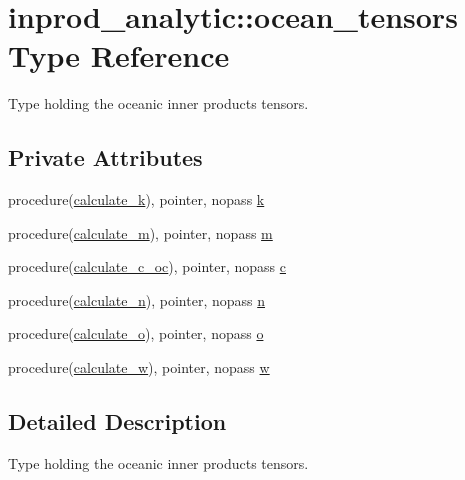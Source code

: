 \hypertarget{structinprod__analytic_1_1ocean__tensors}{}\section{inprod\+\_\+analytic\+:\+:ocean\+\_\+tensors Type Reference}
\label{structinprod__analytic_1_1ocean__tensors}


Type holding the oceanic inner products tensors.  


\subsection*{Private Attributes}
\begin{DoxyCompactItemize}
\item 
procedure(\hyperlink{namespaceinprod__analytic_a084d554f278704061269b6bdf0b85053}{calculate\+\_\+k}), pointer, nopass \hyperlink{structinprod__analytic_1_1ocean__tensors_a9715c83158697198ef484b0bc549bcc3}{k}
\item 
procedure(\hyperlink{namespaceinprod__analytic_a745462230d6120d9486aa7cb724322f5}{calculate\+\_\+m}), pointer, nopass \hyperlink{structinprod__analytic_1_1ocean__tensors_a9f72e3b14a98a50209f86b01626f6c53}{m}
\item 
procedure(\hyperlink{namespaceinprod__analytic_aaa451a1ceea496bac284d4b71c06b4ee}{calculate\+\_\+c\+\_\+oc}), pointer, nopass \hyperlink{structinprod__analytic_1_1ocean__tensors_a0601d4c16c2f7d9e8789619ac9e25311}{c}
\item 
procedure(\hyperlink{namespaceinprod__analytic_af3507292836d9e87909740e9d8a0f9bc}{calculate\+\_\+n}), pointer, nopass \hyperlink{structinprod__analytic_1_1ocean__tensors_a2ccccfae8fb93871f6d7d81d90676b19}{n}
\item 
procedure(\hyperlink{namespaceinprod__analytic_ac8f50f326a84d5b206ed4cf5c86c4301}{calculate\+\_\+o}), pointer, nopass \hyperlink{structinprod__analytic_1_1ocean__tensors_a1002c698464fe4761ac8f0c53908c796}{o}
\item 
procedure(\hyperlink{namespaceinprod__analytic_a3ce2bc9a209cef35849d78e829cfbe5a}{calculate\+\_\+w}), pointer, nopass \hyperlink{structinprod__analytic_1_1ocean__tensors_ad14f4b5bea84f71ecb4f6665b15e78f1}{w}
\end{DoxyCompactItemize}


\subsection{Detailed Description}
Type holding the oceanic inner products tensors. 

